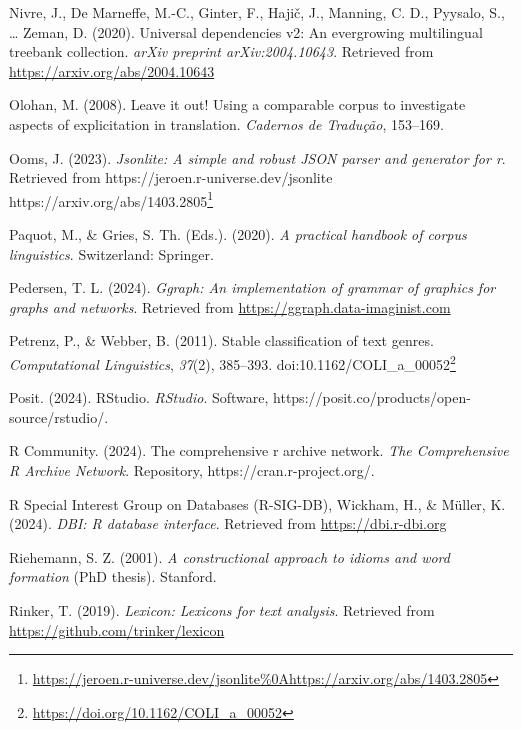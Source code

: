 \documentclass[
  letterpaper,
]{latex/krantz}
\newlength{\cslhangindent}
\newenvironment{CSLReferences}[2] %
 {\begin{list}{}{%
  \setlength{\itemindent}{0pt}
  \setlength{\leftmargin}{0pt}
  \setlength{\parsep}{0pt}
  \ifodd #1
   \setlength{\leftmargin}{\cslhangindent}
   \setlength{\itemindent}{-1\cslhangindent}
  \fi
  \setlength{\itemsep}{#2\baselineskip}}}
 {\end{list}}
\theoremstyle{definition}
\theoremstyle{remark}
\DeclareRobustCommand{\href}[2]{#2\footnote{\url{#1}}}
\begin{document}
\begin{CSLReferences}{1}{0}
Nivre, J., De Marneffe, M.-C., Ginter, F., Hajič, J., Manning, C. D.,
Pyysalo, S., \ldots{} Zeman, D. (2020). Universal dependencies v2: An
evergrowing multilingual treebank collection. \emph{arXiv preprint
arXiv:2004.10643}. Retrieved from \url{https://arxiv.org/abs/2004.10643}

Olohan, M. (2008). Leave it out! Using a comparable corpus to
investigate aspects of explicitation in translation. \emph{Cadernos de
Tradu{ç}{ã}o}, 153--169.

Ooms, J. (2023). \emph{Jsonlite: A simple and robust JSON parser and
generator for r}. Retrieved from
\href{https://jeroen.r-universe.dev/jsonlite\%0Ahttps://arxiv.org/abs/1403.2805}{https://jeroen.r-universe.dev/jsonlite
https://arxiv.org/abs/1403.2805}

Paquot, M., \& Gries, S. Th. (Eds.). (2020). \emph{A practical handbook
of corpus linguistics}. Switzerland: Springer.

Pedersen, T. L. (2024). \emph{Ggraph: An implementation of grammar of
graphics for graphs and networks}. Retrieved from
\url{https://ggraph.data-imaginist.com}

Petrenz, P., \& Webber, B. (2011). Stable classification of text genres.
\emph{Computational Linguistics}, \emph{37}(2), 385--393.
doi:\href{https://doi.org/10.1162/COLI_a_00052}{10.1162/COLI\_a\_00052}

Posit. (2024). RStudio. \emph{RStudio}. Software,
https://posit.co/products/open-source/rstudio/.

R Community. (2024). The comprehensive r archive network. \emph{The
Comprehensive R Archive Network}. Repository,
https://cran.r-project.org/.

R Special Interest Group on Databases (R-SIG-DB), Wickham, H., \&
Müller, K. (2024). \emph{DBI: R database interface}. Retrieved from
\url{https://dbi.r-dbi.org}

Riehemann, S. Z. (2001). \emph{A constructional approach to idioms and
word formation} (PhD thesis). Stanford.

Rinker, T. (2019). \emph{Lexicon: Lexicons for text analysis}. Retrieved
from \url{https://github.com/trinker/lexicon}


\end{CSLReferences}
\end{document}
